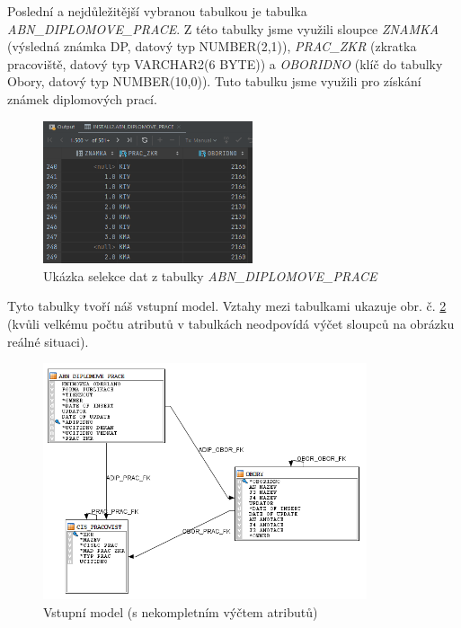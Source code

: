 Poslední a nejdůležitější vybranou tabulkou je tabulka \textit{ABN\_DIPLOMOVE\_PRACE}.
Z této tabulky jsme využili sloupce \textit{ZNAMKA} (výsledná známka DP, datový typ NUMBER(2,1)), \textit{PRAC\_ZKR} (zkratka pracoviště, datový typ VARCHAR2(6 BYTE)) a \textit{OBORIDNO} (klíč do tabulky Obory, datový typ NUMBER(10,0)).
Tuto tabulku jsme využili pro získání známek diplomových prací.

\begin{figure}[htb]
    \centering
    \includegraphics[width=0.55\textwidth]{graphs/fig-dp.png}
    \caption{Ukázka selekce dat z tabulky \textit{ABN\_DIPLOMOVE\_PRACE}}
    \label{fig:fig-dp}
\end{figure}
\FloatBarrier

Tyto tabulky tvoří náš vstupní model.
Vztahy mezi tabulkami ukazuje obr. č. \ref{fig:src-model} (kvůli velkému počtu atributů v tabulkách neodpovídá výčet sloupců na obrázku reálné situaci).

\begin{figure}[htb]
    \centering
    \includegraphics[width=0.85\textwidth]{graphs/src-model.png}
    \caption{Vstupní model (s nekompletním výčtem atributů)}
    \label{fig:src-model}
\end{figure}
\FloatBarrier

